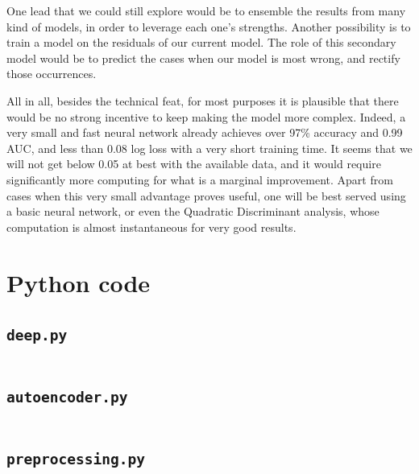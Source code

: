 \documentclass[a4paper,11pt,openany,extrafontsizes,oneside,article,twocolumn]{memoir}
\begin{document}
One lead that we could still explore would be to ensemble the results
from many kind of models, in order to leverage each one's
strengths. Another possibility is to train a model on the residuals of
our current model. The role of this secondary model would be to
predict the cases when our model is most wrong, and rectify those
occurrences.

All in all, besides the technical feat, for most purposes it is
plausible that there would be no strong incentive to keep making the
model more complex. Indeed, a very small and fast neural network
already achieves over 97\% accuracy and 0.99 AUC, and less than 0.08
log loss with a very short training time. It seems that we will not
get below 0.05 at best with the available data, and it would require
significantly more computing for what is a marginal improvement. Apart
from cases when this very small advantage proves useful, one will be
best served using a basic neural network, or even the Quadratic
Discriminant analysis, whose computation is almost instantaneous for
very good results.



\backmatter%
\onecolumn%

\chapter{Python code}

\section{\texttt{deep.py}}

\inputminted[linenos,stepnumber=5]{python}{../deep.py}

\newpage

\section{\texttt{autoencoder.py}}

\inputminted[linenos,stepnumber=5]{python}{../autoencoder.py}

\newpage

\section{\texttt{preprocessing.py}}

\inputminted[linenos,stepnumber=5]{python}{../preprocessing.py}



% 
\end{document}
